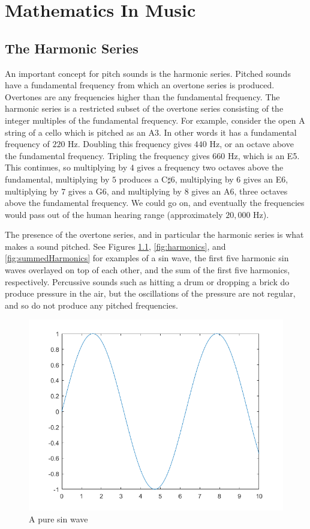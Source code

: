 \chapter{Mathematics In Music} \label{mathinmusic}

\section{The Harmonic Series} \label{mathinmusic:harmonic}

An important concept for pitch sounds is the harmonic series.
Pitched sounds have a fundamental frequency from which an overtone series is produced.
Overtones are any frequencies higher than the fundamental frequency.
The harmonic series is a restricted subset of the overtone series consisting of the integer multiples of the fundamental frequency.
For example, consider the open A string of a cello which is pitched as an A3.
In other words it has a fundamental frequency of $220$ Hz.
Doubling this frequency gives $440$ Hz, or an octave above the fundamental frequency.
Tripling the frequency gives $660$ Hz, which is an E5.
This continues, so multiplying by $4$ gives a frequency two octaves above the fundamental, multiplying by $5$ produces a C$\sharp$6, multiplying by $6$ gives an E6, multiplying by $7$ gives a G6, and multiplying by $8$ gives an A6, three octaves above the fundamental frequency.
We could go on, and eventually the frequencies would pass out of the human hearing range (approximately $20,000$ Hz).

The presence of the overtone series, and in particular the harmonic series is what makes a sound pitched.
See Figures \ref{fig:sin}, \ref{fig:harmonics}, and \ref{fig:summedHarmonics} for examples of a sin wave, the first five harmonic sin waves overlayed on top of each other, and the sum of the first five harmonics, respectively.
Percussive sounds such as hitting a drum or dropping a brick do produce pressure in the air, but the oscillations of the pressure are not regular, and so do not produce any pitched frequencies.

\begin{figure}
	\centering
	\includegraphics[width=\textwidth]{../figures/sinWave.png}
	\caption{A pure sin wave}
	\label{fig:sin}
\end{figure}


